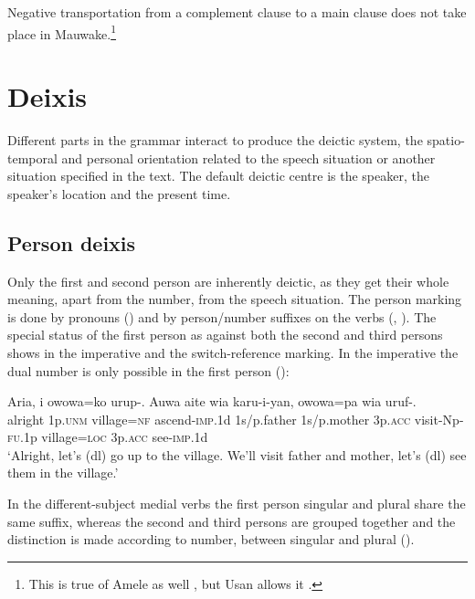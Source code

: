 Negative transportation from a complement clause to a main clause does not take place in Mauwake.\footnote{This is true of Amele as well \citep[44]{Roberts1987}, but Usan allows it \citep[278--280]{Reesink1987}.} 

\section{Deixis} 

Different parts in the grammar interact to produce the deictic system, the spatio-temporal and personal orientation related to the speech situation or another situation specified in the text. The default deictic centre is the speaker, the speaker's location and the present time.  

\subsection{Person deixis} \label{sec:6.3.1}

Only the first and second person are inherently deictic, as they get their whole meaning, apart from the number, from the speech situation. The person marking is done by pronouns () and by person/number suffixes on the verbs (, ). The special status of the first person as against both the second and third persons shows in the imperative and the switch-reference marking. In the imperative the dual number is only possible in the first person (): 

\ea%
\label{ex:6:x1262}
\gll Aria,  i  owowa=ko  urup-.  Auwa  aite wia  karu-i-yan,  owowa=pa  wia  uruf-.\\
alright  1p.\textsc{unm}  village=\textsc{nf}  ascend-\textsc{imp}.1d  1s/p.father  1s/p.mother 3p.\textsc{acc}  visit-Np-\textsc{fu}.1p  village=\textsc{loc}  3p.\textsc{acc}  see-\textsc{imp}.1d\\
\glt `Alright, let's (dl) go up to the village. We'll visit father and mother, let's (dl) see them in the village.'
\z

In the different-subject medial verbs the first person singular and plural share the same suffix, whereas the second and third persons are grouped together and the distinction is made according to number, between singular and plural ().

